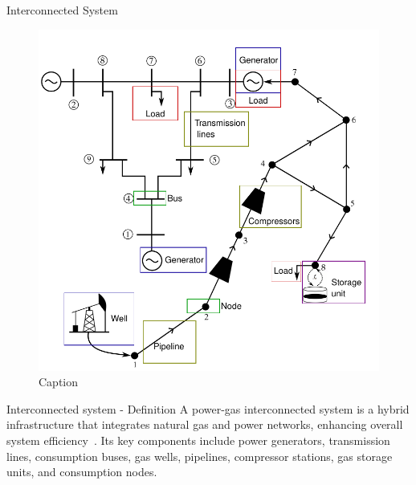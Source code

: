 \documentclass[hyperref={colorlinks,citecolor=blue,linkcolor=blue,urlcolor=blue}]{beamer}
\begin{document}
\begin{frame}{Interconnected System} 
\begin{figure}
    \centering
    \includegraphics[scale=0.6]{figures/interconnected-full.pdf}
    \caption{Caption}
    \label{fig:interconneted-full}
\end{figure}
\end{frame}


\begin{frame}{Interconnected system - Definition}
A power-gas interconnected system is a hybrid infrastructure that integrates natural gas and power networks, enhancing overall system efficiency~\cite{Duan_Liu_Yang_2022}. Its key components include power generators, transmission lines, consumption buses, gas wells, pipelines, compressor stations, gas storage units, and consumption nodes. 
    
\end{frame}
\end{document}
